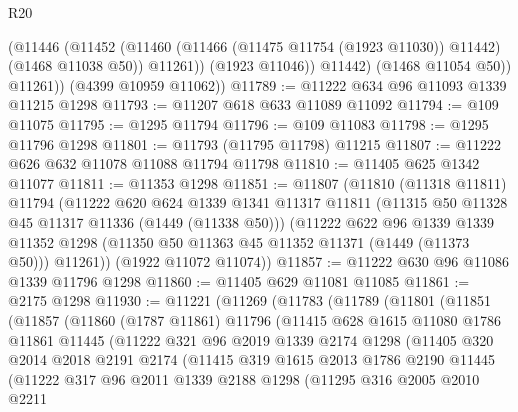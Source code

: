 \begin{lexlean}{R20}
\begin{coremodule}
                (@11446
                  (@11452
                    (@11460 (@11466 (@11475 @11754 (@1923 @11030)) @11442) (@1468 @11038 @50))
                    @11261))
                (@1923 @11046))
              @11442)
            (@1468 @11054 @50))
          @11261))
      (@4399 @10959 @11062))
@11789 := @11222 @634 @96 @11093 @1339 @11215 @1298
@11793 := @11207 @618 @633 @11089 @11092
@11794 := @109 @11075
@11795 := @1295 @11794
@11796 := @109 @11083
@11798 := @1295 @11796 @1298
@11801 := @11793 (@11795 @11798) @11215
@11807 := @11222 @626 @632 @11078 @11088 @11794 @11798
@11810 := @11405 @625 @1342 @11077
@11811 := @11353 @1298
@11851 := @11807
    (@11810
      (@11318 @11811)
      @11794
      (@11222
        @620
        @624
        @1339
        @1341
        @11317
        @11811
        (@11315 @50 @11328 @45 @11317 @11336 (@1449 (@11338 @50)))
        (@11222
          @622
          @96
          @1339
          @1339
          @11352
          @1298
          (@11350 @50 @11363 @45 @11352 @11371 (@1449 (@11373 @50)))
          @11261))
      (@1922 @11072 @11074))
@11857 := @11222 @630 @96 @11086 @1339 @11796 @1298
@11860 := @11405 @629 @11081 @11085
@11861 := @2175 @1298
@11930 := @11221
    (@11269
      (@11783
        (@11789
          (@11801
            (@11851
              (@11857
                (@11860
                  (@1787 @11861)
                  @11796
                  (@11415
                    @628
                    @1615
                    @11080
                    @1786
                    @11861
                    @11445
                    (@11222
                      @321
                      @96
                      @2019
                      @1339
                      @2174
                      @1298
                      (@11405
                        @320
                        @2014
                        @2018
                        @2191
                        @2174
                        (@11415
                          @319
                          @1615
                          @2013
                          @1786
                          @2190
                          @11445
                          (@11222
                            @317
                            @96
                            @2011
                            @1339
                            @2188
                            @1298
                            (@11295
                              @316
                              @2005
                              @2010
                              @2211

\end{coremodule}
\end{lexlean}
